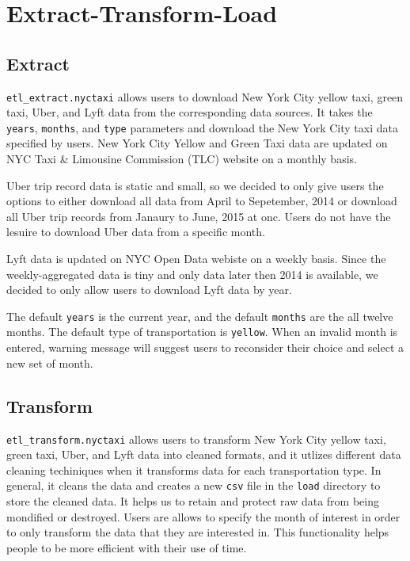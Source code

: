 \documentclass[12pt,twoside]{reedthesis}
\theoremstyle{definition}
\theoremstyle{definition}
\theoremstyle{definition}
\theoremstyle{remark}
\begin{document}
\section{Extract-Transform-Load}\label{extract-transform-load}

\subsection{Extract}\label{extract}

\texttt{etl\_extract.nyctaxi} allows users to download New York City
yellow taxi, green taxi, Uber, and Lyft data from the corresponding data
sources. It takes the \texttt{years}, \texttt{months}, and \texttt{type}
parameters and download the New York City taxi data specified by users.
New York City Yellow and Green Taxi data are updated on NYC Taxi \&
Limousine Commission (TLC) website on a monthly basis.

Uber trip record data is static and small, so we decided to only give
users the options to either download all data from April to Sepetember,
2014 or download all Uber trip records from Janaury to June, 2015 at
onc. Users do not have the lesuire to download Uber data from a specific
month.

Lyft data is updated on NYC Open Data webiste on a weekly basis. Since
the weekly-aggregated data is tiny and only data later then 2014 is
available, we decided to only allow users to download Lyft data by year.

The default \texttt{years} is the current year, and the default
\texttt{months} are the all twelve months. The default type of
transportation is \texttt{yellow}. When an invalid month is entered,
warning message will suggest users to reconsider their choice and select
a new set of month.

\subsection{Transform}\label{transform}

\texttt{etl\_transform.nyctaxi} allows users to transform New York City
yellow taxi, green taxi, Uber, and Lyft data into cleaned formats, and
it utlizes different data cleaning techiniques when it transforms data
for each transportation type. In general, it cleans the data and creates
a new \texttt{csv} file in the \texttt{load} directory to store the
cleaned data. It helps us to retain and protect raw data from being
mondified or destroyed. Users are allows to specify the month of
interest in order to only transform the data that they are interested
in. This functionality helps people to be more efficient with their use
of time.
\end{document}
